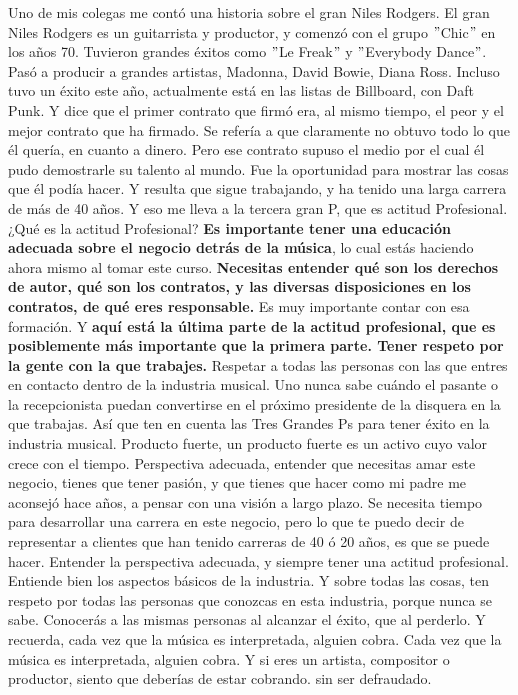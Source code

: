 \documentclass[10pt]{book}
\begin{document}
Uno de mis colegas me contó una historia  sobre el gran Niles Rodgers. El gran Niles Rodgers es un guitarrista y productor, y comenzó con el grupo $"$Chic$"$ en los años 70. Tuvieron grandes éxitos como $"$Le Freak$"$ y $"$Everybody Dance$"$. Pasó a producir a grandes artistas, Madonna, David Bowie, Diana Ross. Incluso tuvo un éxito este año, actualmente está  en las listas de Billboard, con Daft Punk. Y dice que el primer contrato que firmó era, al mismo tiempo, el peor y el mejor contrato que ha firmado. Se refería a que claramente no obtuvo todo lo que él quería, en cuanto a dinero. Pero ese contrato supuso el medio por el cual  él pudo demostrarle su talento al mundo. Fue la oportunidad para mostrar  las cosas que él podía hacer. Y resulta que sigue trabajando, y ha tenido una larga carrera de más de 40 años. Y eso me lleva a la tercera gran P,  que es actitud Profesional. ¿Qué es la actitud Profesional? \textbf{Es importante tener una educación adecuada sobre el negocio detrás de la música}, lo cual estás haciendo  ahora mismo al tomar este curso. \textbf{Necesitas entender qué son los derechos de autor,  qué son los contratos, y las diversas disposiciones en los contratos,  de qué eres responsable.} Es muy importante contar con esa formación. Y \textbf{aquí está la última parte de la actitud profesional,  que es posiblemente más importante que la primera parte. Tener respeto por la gente con la que trabajes.} Respetar a todas las personas con las que entres en contacto  dentro de la industria musical. Uno nunca sabe cuándo  el pasante o la recepcionista puedan convertirse en el próximo presidente  de la disquera en la que trabajas. Así que ten en cuenta las Tres Grandes Ps para tener éxito en la industria musical. Producto fuerte, un producto fuerte es un activo cuyo valor  crece con el tiempo. Perspectiva adecuada, entender que  necesitas amar este negocio, tienes que tener pasión, y  que tienes que hacer como mi padre me aconsejó hace años, a pensar con una visión a largo plazo. Se necesita tiempo para desarrollar  una carrera en este negocio, pero lo que te puedo decir de representar  a clientes que han tenido carreras de 40 ó 20 años, es que se puede hacer. Entender la perspectiva adecuada,  y siempre tener una actitud profesional. Entiende bien los aspectos básicos de la industria. Y sobre todas las cosas, ten respeto por todas las personas que conozcas en esta industria,  porque nunca se sabe. Conocerás a las mismas personas al alcanzar el éxito, que al perderlo. Y recuerda, cada vez que la música es interpretada, alguien cobra. Cada vez que la música es interpretada, alguien cobra. Y si eres un artista, compositor o productor,  siento que deberías de estar cobrando. sin ser defraudado.
\end{document}
